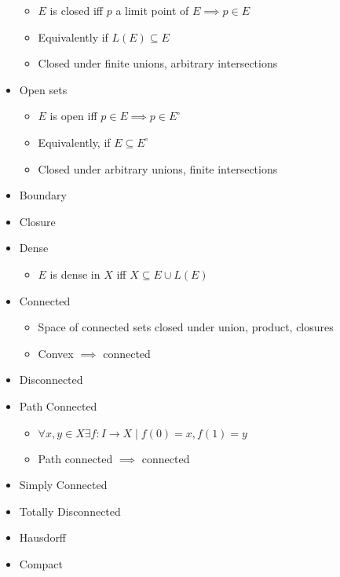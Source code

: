 \begin{itemize}
  \begin{itemize}
  \tightlist
  \item
    \(E\) is closed iff \(p\) a limit point of \(E \implies p \in E\)
  \item
    Equivalently if \(L(E) \subseteq E\)
  \item
    Closed under finite unions, arbitrary intersections
  \end{itemize}
\item
  Open sets

  \begin{itemize}
  \tightlist
  \item
    \(E\) is open iff \(p\in E \implies p \in E^\circ\)
  \item
    Equivalently, if \(E \subseteq E^\circ\)
  \item
    Closed under arbitrary unions, finite intersections
  \end{itemize}
\item
  Boundary
\item
  Closure
\item
  Dense

  \begin{itemize}
  \tightlist
  \item
    \(E\) is dense in \(X\) iff \(X \subseteq E \cup L(E)\)
  \end{itemize}
\item
  Connected

  \begin{itemize}
  \tightlist
  \item
    Space of connected sets closed under union, product, closures
  \item
    Convex \(\implies\) connected
  \end{itemize}
\item
  Disconnected
\item
  Path Connected

  \begin{itemize}
  \tightlist
  \item
    \(\forall x,y \in X \exists f: I \to X \mid f(0) = x, f(1) = y\)
  \item
    Path connected \(\implies\) connected
  \end{itemize}
\item
  Simply Connected
\item
  Totally Disconnected
\item
  Hausdorff
\item
  Compact


\end{itemize}
